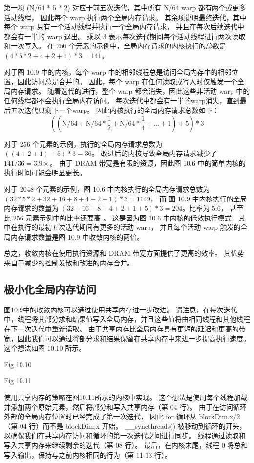 第一项 (N/64 * 5 * 2) 对应于前五次迭代，其中所有 N/64 warp 都有两个或更多活动线程，
因此每个 warp 执行两个全局内存请求。 其余项说明最终迭代，其中每个 warp 只有一个活动线程并执行一个全局内存请求，
并且在每次后续迭代中都会有一半的 warp 退出。 乘以 3 表示每次迭代期间每个活动线程进行两次读取和一次写入。 
在 256 个元素的示例中，全局内存请求的内核执行的总数是 $(4 * 5 * 2+4+2+1) * 3 = 141$。

对于图 10.9 中的内核，每个 warp 中的相邻线程总是访问全局内存中的相邻位置，因此访问总是合并的。 
因此，每个 warp 在任何读取或写入时仅触发一个全局内存请求。 
随着迭代的进行，整个 warp 都会消失，因此这些非活动 warp 中的任何线程都不会执行全局内存访问。 
每次迭代中都会有一半的warp消失，直到最后五次迭代只剩下一个warp。 因此内核执行的全局内存请求总数如下：
$$
\left(\left(\mathrm{N} / 64+\mathrm{N} / 64*\frac{1}{2}+\mathrm{N} / 64*\frac{1}{4}+\ldots+1\right)+5\right)* 3
$$

对于 256 个元素的示例，执行的全局内存请求总数为 $((4+2+1)+5) * 3 = 36$。
改进后的内核导致全局内存请求减少了 $141/36 = 3.9\times$。 
由于 DRAM 带宽是有限的资源，因此图 10.6 中的简单内核的执行时间可能会明显更长。

对于 2048 个元素的示例，图 10.6 中内核执行的全局内存请求总数为 $(32 * 5 * 2+32+16+8+4+2+1) * 3 = 1149$，
而 图 10.9 中内核执行的全局内存请求的数量为 $(32+16+8+4+2+1+5) * 3 = 204$。比率为 5.6，
甚至比 256 元素示例中的比率还要高 。 
这是因为图 10.6 中内核的低效执行模式，其中在执行的最初五次迭代期间有更多的活动 warp，
并且每个活动 warp 触发的全局内存请求数量是图 10.9 中收敛内核的两倍。

总之，收敛内核在使用执行资源和 DRAM 带宽方面提供了更高的效率。 其优势来自于减少的控制发散和改进的内存合并。

\subsection{极小化全局内存访问}
图10.9中的收敛内核可以通过使用共享内存进一步改进。 
请注意，在每次迭代中，线程将其部分求和结果值写入全局内存，并且这些值将由相同线程和其他线程在下一次迭代中重新读取。 
由于共享内存比全局内存具有更短的延迟和更高的带宽，因此我们可以通过将部分求和结果保留在共享内存中来进一步提高执行速度。 
这个想法如图 10.10 所示。

{\color{red} Fig 10.10}

{\color{red} Fig 10.11}

使用共享内存的策略在图10.11所示的内核中实现。 
这个想法是使用每个线程加载并添加两个原始元素，然后将部分和写入共享内存（第 04 行）。 
由于在访问循环外部的全局内存位置时已经完成了第一次迭代，
因此 for 循环从 blockDim.x/2 （第 04 行）而不是 blockDim.x 开始。 
\_\_syncthreads() 被移动到循环的开头，以确保我们在共享内存访问和循环的第一次迭代之间进行同步。 
线程通过读取和写入共享内存来继续剩余的迭代（第 08 行）。 
最后，在内核末尾，线程 0 将总和写入输出，保持与之前内核相同的行为（第 11-13 行）。

